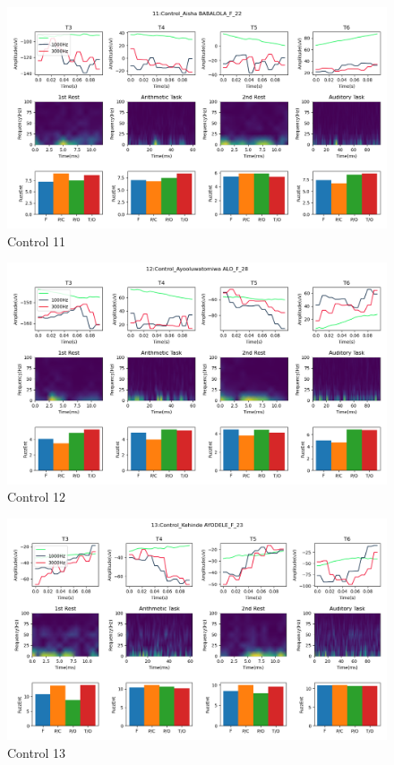\documentclass[conference]{IEEEconf}
\begin{document}
\clearpage
\begin{figure}
  \includegraphics[width=\textwidth]{../../data_analysis_results/results/Control/11.png}
  \caption{Control 11}
  \label{fig:control_11}
\end{figure}
\clearpage
\begin{figure}
  \includegraphics[width=\textwidth]{../../data_analysis_results/results/Control/12.png}
  \caption{Control 12}
  \label{fig:control_12}
\end{figure}
\clearpage
\begin{figure}
  \includegraphics[width=\textwidth]{../../data_analysis_results/results/Control/13.png}
  \caption{Control 13}
  \label{fig:control_13}
\end{figure}
\end{document}
